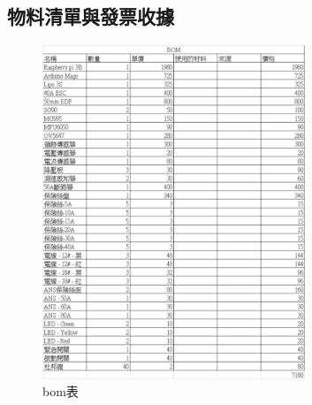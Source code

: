 \documentclass[12pt]{article}       %
\begin{document}
\subsection{物料清單與發票收據} 
\hspace{2em}
\begin{figure}[H]
    \centering
    \includegraphics[width=0.7\textwidth]{8.jpg}     %
    \caption{bom表}    %
    \label{fig:8}    %
\end{figure}
\end{document}
